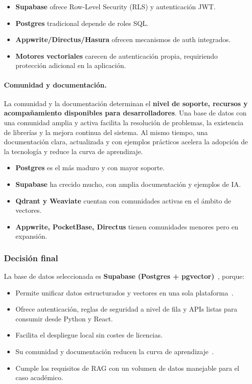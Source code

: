 \begin{itemize}
    \item \textbf{Supabase} ofrece Row-Level Security (RLS) y autenticación JWT.
    \item \textbf{Postgres} tradicional depende de roles SQL.
    \item \textbf{Appwrite/Directus/Hasura} ofrecen mecanismos de auth integrados.
    \item \textbf{Motores vectoriales} carecen de autenticación propia, requiriendo protección adicional en la aplicación.
\end{itemize}

\paragraph{Comunidad y documentación.}

La comunidad y la documentación determinan el \textbf{nivel de soporte, recursos y acompañamiento disponibles para desarrolladores}. Una base de datos con una comunidad amplia y activa facilita la resolución de problemas, la existencia de librerías y la mejora continua del sistema. Al mismo tiempo, una documentación clara, actualizada y con ejemplos prácticos acelera la adopción de la tecnología y reduce la curva de aprendizaje.

\begin{itemize}
    \item \textbf{Postgres} es el más maduro y con mayor soporte.
    \item \textbf{Supabase} ha crecido mucho, con amplia documentación y ejemplos de IA.
    \item \textbf{Qdrant y Weaviate} cuentan con comunidades activas en el ámbito de vectores.
    \item \textbf{Appwrite, PocketBase, Directus} tienen comunidades menores pero en expansión.
\end{itemize}

\subsubsection{Decisión final}

La base de datos seleccionada es \textbf{Supabase (Postgres + pgvector)}~\cite{supabasedocs,pgvectorgithub}, porque:

\begin{itemize}
    \item Permite unificar datos estructurados y vectores en una sola plataforma~\cite{lewis2020retrieval}.
    \item Ofrece autenticación, reglas de seguridad a nivel de fila y APIs listas para consumir desde Python y React.
    \item Facilita el despliegue local sin costes de licencias.
    \item Su comunidad y documentación reducen la curva de aprendizaje~\cite{supabasedocs}.
    \item Cumple los requisitos de RAG con un volumen de datos manejable para el caso académico.
\end{itemize}

